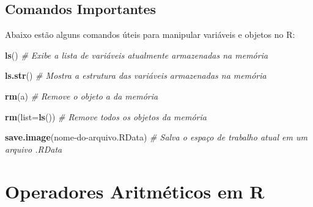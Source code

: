 \documentclass[
]{book}
\newenvironment{Shaded}{\begin{snugshade}}{\end{snugshade}}
\newcommand{\AttributeTok}[1]{\textcolor[rgb]{0.13,0.29,0.53}{#1}}
\newcommand{\CommentTok}[1]{\textcolor[rgb]{0.56,0.35,0.01}{\textit{#1}}}
\newcommand{\FunctionTok}[1]{\textcolor[rgb]{0.13,0.29,0.53}{\textbf{#1}}}
\newcommand{\NormalTok}[1]{#1}
\newcommand{\StringTok}[1]{\textcolor[rgb]{0.31,0.60,0.02}{#1}}
\begin{document}
\subsection{Comandos Importantes}\label{comandos-importantes}

Abaixo estão alguns comandos úteis para manipular variáveis e objetos no
R:

\begin{Shaded}
\begin{Highlighting}[]
\FunctionTok{ls}\NormalTok{() }\CommentTok{\# Exibe a lista de variáveis atualmente armazenadas na memória}
    
\FunctionTok{ls.str}\NormalTok{() }\CommentTok{\# Mostra a estrutura das variáveis armazenadas na memória}
    
\FunctionTok{rm}\NormalTok{(a) }\CommentTok{\# Remove o objeto \textquotesingle{}a\textquotesingle{} da memória}
    
\FunctionTok{rm}\NormalTok{(}\AttributeTok{list=}\FunctionTok{ls}\NormalTok{()) }\CommentTok{\# Remove todos os objetos da memória}
    
\FunctionTok{save.image}\NormalTok{(}\StringTok{\textquotesingle{}nome{-}do{-}arquivo.RData\textquotesingle{}}\NormalTok{) }\CommentTok{\# Salva o espaço de trabalho atual em um arquivo .RData}
\end{Highlighting}
\end{Shaded}

\section{Operadores Aritméticos em R}\label{operadores-aritmuxe9ticos-em-r}
\end{document}
